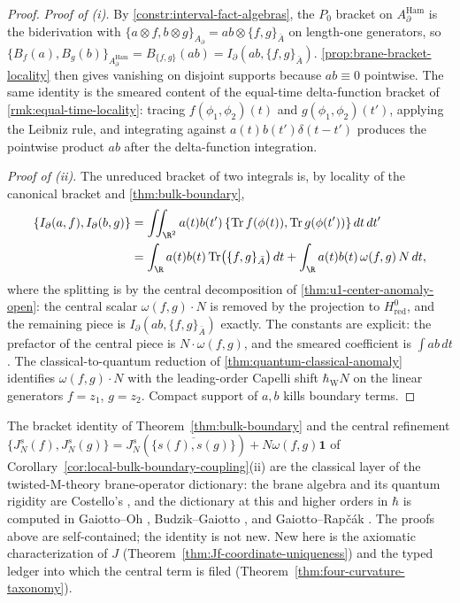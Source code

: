 \documentclass[11pt]{memoir}
\begin{document}
\begin{proof}
  \emph{Proof of (i).} By \ref{constr:interval-fact-algebras}, the
  $P_0$ bracket on $A_\partial^{\mathrm{Ham}}$ is the biderivation
  with $\{a\otimes f,b\otimes g\}_{A_\partial}=ab\otimes\{f,g\}_{\bar A}$
  on length-one generators, so
  $\{B_f(a),B_g(b)\}_{A_\partial^{\mathrm{Ham}}}=B_{\{f,g\}}(ab)
  =I_\partial(ab,\{f,g\}_{\bar A})$. \ref{prop:brane-bracket-locality}
  then gives vanishing on disjoint supports because
  $ab\equiv 0$ pointwise. The same identity is the smeared content of
  the equal-time delta-function bracket of
  \ref{rmk:equal-time-locality}: tracing
  $f(\phi_1,\phi_2)(t)$ and $g(\phi_1,\phi_2)(t')$, applying the
  Leibniz rule, and integrating against $a(t)b(t')\delta(t-t')$ produces
  the pointwise product $ab$ after the delta-function integration.

  \emph{Proof of (ii).} The unreduced bracket of two integrals is, by
  locality of the canonical bracket and \ref{thm:bulk-boundary},
  \begin{align*}
    \{I_\partial(a,f),I_\partial(b,g)\}
    &=\iint_{\R^2}a(t)b(t')\,
      \{\mathrm{Tr}\,f(\phi(t)),\mathrm{Tr}\,g(\phi(t'))\}\,dt\,dt'\\
    &=\int_\R a(t)b(t)\,\mathrm{Tr}\bigl(\{f,g\}_{\bar A}\bigr)\,dt
      +\int_\R a(t)b(t)\,\omega(f,g)\,N\,dt,
  \end{align*}
  where the splitting is by the central decomposition of
  \ref{thm:u1-center-anomaly-open}: the central scalar
  $\omega(f,g)\cdot N$ is removed by the projection to
  $H^0_{\mathrm{red}}$, and the remaining piece is
  $I_\partial(ab,\{f,g\}_{\bar A})$ exactly. The constants are
  explicit: the prefactor of the central piece is $N\cdot\omega(f,g)$,
  and the smeared coefficient is $\int ab\,dt$. The
  classical-to-quantum reduction of
  \ref{thm:quantum-classical-anomaly} identifies $\omega(f,g)\cdot N$
  with the leading-order Capelli shift $\hbar_{\mathrm{W}}N$ on the linear
  generators $f=z_1$, $g=z_2$. Compact support of $a,b$ kills boundary
  terms.
\end{proof}

\begin{rmk}
\label{rmk:trace-dictionary-provenance}
  The bracket identity of Theorem~\ref{thm:bulk-boundary} and the
  central refinement
  \(\{J_N^s(f),J_N^s(g)\}
    =J_N^s(\overline{\{s(f),s(g)\}})+N\omega(f,g)\mathbf1\)
  of Corollary~\ref{cor:local-bulk-boundary-coupling}(ii) are the
  classical layer of the twisted-M-theory brane-operator dictionary:
  the brane algebra and its quantum rigidity are Costello's
  \cite{costello-twistedM}\cite{costello-m2-koszul}, and the
  dictionary at this and higher orders in \(\hbar\) is computed in
  Gaiotto--Oh \cite{gaiotto-oh-omega}, Budzik--Gaiotto
  \cite{budzik-gaiotto-twisted-holography}, and Gaiotto--Rap\v{c}\'ak
  \cite{gaiotto-rapcak-miura}.  The proofs above are self-contained;
  the identity is not new.  New here is the axiomatic
  characterization of \(J\)
  (Theorem~\ref{thm:Jf-coordinate-uniqueness}) and the typed ledger
  into which the central term is filed
  (Theorem~\ref{thm:four-curvature-taxonomy}).
\end{rmk}
\end{document}
